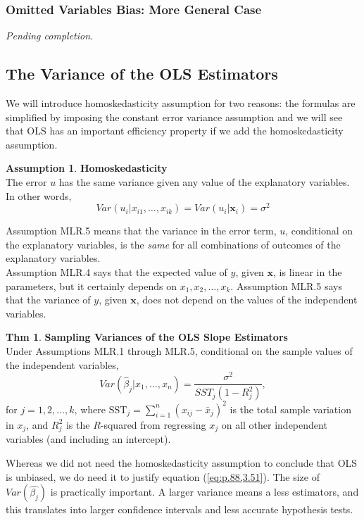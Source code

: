 \documentclass[a4paper, 10pt]{article}
\theoremstyle{definition}	%
\newtheorem{theorem}{Thm}
\newtheorem{assumption}{Assumption}
\begin{document}
\subsubsection{Omitted Variables Bias: More General Case}
\textit{Pending completion.}

\subsection{The Variance of the OLS Estimators}
We will introduce homoskedasticity assumption for two reasons: the formulas are simplified by imposing the constant error variance assumption and we will see that OLS has an important efficiency property if we add the homoskedasticity assumption.

\begin{assumption}
    \textbf{Homoskedasticity}\\
    The error $u$ has the same variance given any value of the explanatory variables. In other words, 
    \begin{equation*}
        Var(u_i|x_{i1}, \ldots, x_{ik}) = Var(u_i|\mathbf{x}_i) = \sigma^2
    \end{equation*}
\end{assumption}
Assumption MLR.5 means that the variance in the error term, $u$, conditional on the explanatory variables, is the \textit{same} for all combinations of outcomes of the explanatory variables.\\
Assumption MLR.4 says that the expected value of $y$, given $\mathbf{x}$, is linear in the parameters, but it certainly depends on $x_1, x_2, \ldots, x_k$. Assumption MLR.5 says that the variance of $y$, given $\mathbf{x}$, does not depend on the values of the independent variables.

\begin{theorem}
    \textbf{Sampling Variances of the OLS Slope Estimators}\\
    Under Assumptions MLR.1 through MLR.5, conditional on the sample values of the independent variables,
    \begin{equation}
        Var(\hat{\beta}_j|x_1, \ldots, x_n) = \frac{\sigma^2}{SST_j(1 - R_j^2)}, \label{eq:p.88,3.51}
    \end{equation}
    for $j = 1, 2, \ldots, k$, where $\text{SST}_j = \sum_{i=1}^n (x_{ij} - \bar{x}_j)^2$ is the total sample variation in $x_j$, and $R_j^2$ is the $R$-squared from regressing $x_j$ on all other independent variables (and including an intercept).
\end{theorem}
Whereas we did not need the homoskedasticity assumption to conclude that OLS is unbiased, we do need it to justify equation (\ref{eq:p.88,3.51}). The size of $Var(\hat{\beta_j})$ is practically important. A larger variance means a less estimators, and this translates into larger confidence intervals and less accurate hypothesis tests.
\end{document}
